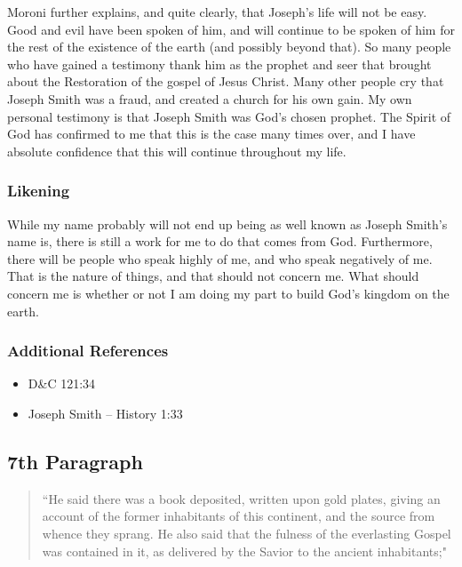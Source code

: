 \documentclass[12pt]{report}
\begin{document}
Moroni further explains, and quite clearly, that Joseph's life will not be easy.  Good and evil have been spoken of him, and will continue to be spoken of him for the rest of the existence of the earth (and possibly beyond that). So many people who have gained a testimony thank him as the prophet and seer that brought about the Restoration of the gospel of Jesus Christ.  Many other people cry that Joseph Smith was a fraud, and created a church for his own gain.  My own personal testimony is that Joseph Smith was God's chosen prophet.  The Spirit of God has confirmed to me that this is the case many times over, and I have absolute confidence that this will continue throughout my life.

\subsubsection{Likening\label{js:likening6}}
While my name probably will not end up being as well known as Joseph Smith's name is, there is still a work for me to do that comes from God.  Furthermore, there will be people who speak highly of me, and who speak negatively of me. That is the nature of things, and that should not concern me.  What should concern me is whether or not I am doing my part to build God's kingdom on the earth.

\subsubsection{Additional References\label{js:references6}}
\begin{itemize}
\item D\&C 121:34
\item Joseph Smith -- History 1:33
\end{itemize}

\subsection{7th Paragraph\label{js:7th}}
\begin{center}
\begin{quote}
``He said there was a book deposited, written upon gold plates, giving an account of the former inhabitants of this continent, and the source from whence they sprang.  He also said that the fulness of the everlasting Gospel was contained in it, as delivered by the Savior to the ancient inhabitants;"
\end{quote}
\end{center}
\end{document}
